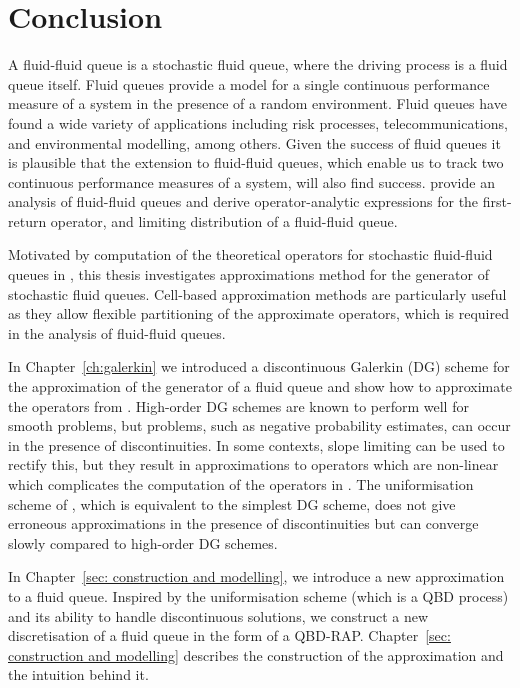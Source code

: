 \chapter{Conclusion\label{ch: conclusion}} 
A fluid-fluid queue is a stochastic fluid queue, where the driving process is a fluid queue itself. Fluid queues provide a model for a single continuous performance measure of a system in the presence of a random environment. Fluid queues have found a wide variety of applications including risk processes, telecommunications, and environmental modelling, among others. Given the success of fluid queues it is plausible that the extension to fluid-fluid queues, which enable us to track two continuous performance measures of a system, will also find success. \cite{bo2014} provide an analysis of fluid-fluid queues and derive operator-analytic expressions for the first-return operator, and limiting distribution of a fluid-fluid queue.

Motivated by computation of the theoretical operators for stochastic fluid-fluid queues in \cite{bo2014}, this thesis investigates approximations method for the generator of stochastic fluid queues. Cell-based approximation methods are particularly useful as they allow flexible partitioning of the approximate operators, which is required in the analysis of fluid-fluid queues. 

In Chapter~\ref{ch:galerkin} we introduced a discontinuous Galerkin (DG) scheme for the approximation of the generator of a fluid queue and show how to approximate the operators from \cite{bo2014}. High-order DG schemes are known to perform well for smooth problems, but problems, such as negative probability estimates, can occur in the presence of discontinuities. In some contexts, slope limiting can be used to rectify this, but they result in approximations to operators which are non-linear which complicates the computation of the operators in \cite{bo2014}. The uniformisation scheme of \cite{bo2013}, which is equivalent to the simplest DG scheme, does not give erroneous approximations in the presence of discontinuities but can converge slowly compared to high-order DG schemes. 

In Chapter~\ref{sec: construction and modelling}, we introduce a new approximation to a fluid queue. Inspired by the uniformisation scheme (which is a QBD process) and its ability to handle discontinuous solutions, we construct a new discretisation of a fluid queue in the form of a QBD-RAP. Chapter~\ref{sec: construction and modelling} describes the construction of the approximation and the intuition behind it. 

